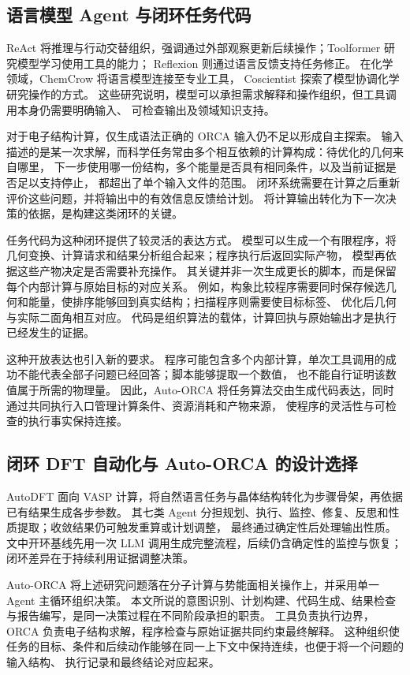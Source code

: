 \documentclass[UTF8,fontset=fandol,a4paper,11pt]{ctexart}
\begin{document}
\subsection{语言模型 Agent 与闭环任务代码}
ReAct 将推理与行动交替组织，强调通过外部观察更新后续操作；Toolformer 研究模型学习使用工具的能力；%
Reflexion 则通过语言反馈支持任务修正\cite{react,toolformer,reflexion}。%
在化学领域，ChemCrow 将语言模型连接至专业工具，%
Coscientist 探索了模型协调化学研究操作的方式\cite{chemcrow,coscientist}。%
这些研究说明，模型可以承担需求解释和操作组织，但工具调用本身仍需要明确输入、%
可检查输出及领域知识支持。

对于电子结构计算，仅生成语法正确的 ORCA 输入仍不足以形成自主探索。%
输入描述的是某一次求解，而科学任务常由多个相互依赖的计算构成：待优化的几何来自哪里，%
下一步使用哪一份结构，多个能量是否具有相同条件，以及当前证据是否足以支持停止，%
都超出了单个输入文件的范围。%
闭环系统需要在计算之后重新评价这些问题，并将输出中的有效信息反馈给计划。%
将计算输出转化为下一次决策的依据，是构建这类闭环的关键。

任务代码为这种闭环提供了较灵活的表达方式。%
模型可以生成一个有限程序，将几何变换、计算请求和结果分析组合起来；程序执行后返回实际产物，%
模型再依据这些产物决定是否需要补充操作。%
其关键并非一次生成更长的脚本，而是保留每个内部计算与原始目标的对应关系。%
例如，构象比较程序需要同时保存候选几何和能量，使排序能够回到真实结构；扫描程序则需要使目标标签、%
优化后几何与实际二面角相互对应。%
代码是组织算法的载体，计算回执与原始输出才是执行已经发生的证据。

这种开放表达也引入新的要求。%
程序可能包含多个内部计算，单次工具调用的成功不能代表全部子问题已经回答；脚本能够提取一个数值，%
也不能自行证明该数值属于所需的物理量。%
因此，Auto-ORCA 将任务算法交由生成代码表达，同时通过共同执行入口管理计算条件、资源消耗和产物来源，%
使程序的灵活性与可检查的执行事实保持连接。

\subsection{闭环 DFT 自动化与 Auto-ORCA 的设计选择}
AutoDFT 面向 VASP 计算，将自然语言任务与晶体结构转化为步骤骨架，再依据已有结果生成各步参数。%
其七类 Agent 分担规划、执行、监控、修复、反思和性质提取；收敛结果仍可触发重算或计划调整，%
最终通过确定性后处理输出性质\cite{autodft}。%
文中开环基线先用一次 LLM 调用生成完整流程，后续仍含确定性的监控与恢复；%
闭环差异在于持续利用证据调整决策。

Auto-ORCA 将上述研究问题落在分子计算与势能面相关操作上，并采用单一 Agent 主循环组织决策。%
本文所说的意图识别、计划构建、代码生成、结果检查与报告编写，是同一决策过程在不同阶段承担的职责。%
工具负责执行边界，ORCA 负责电子结构求解，程序检查与原始证据共同约束最终解释。%
这种组织使任务的目标、条件和后续动作能够在同一上下文中保持连续，也便于将一个问题的输入结构、%
执行记录和最终结论对应起来。
\end{document}

